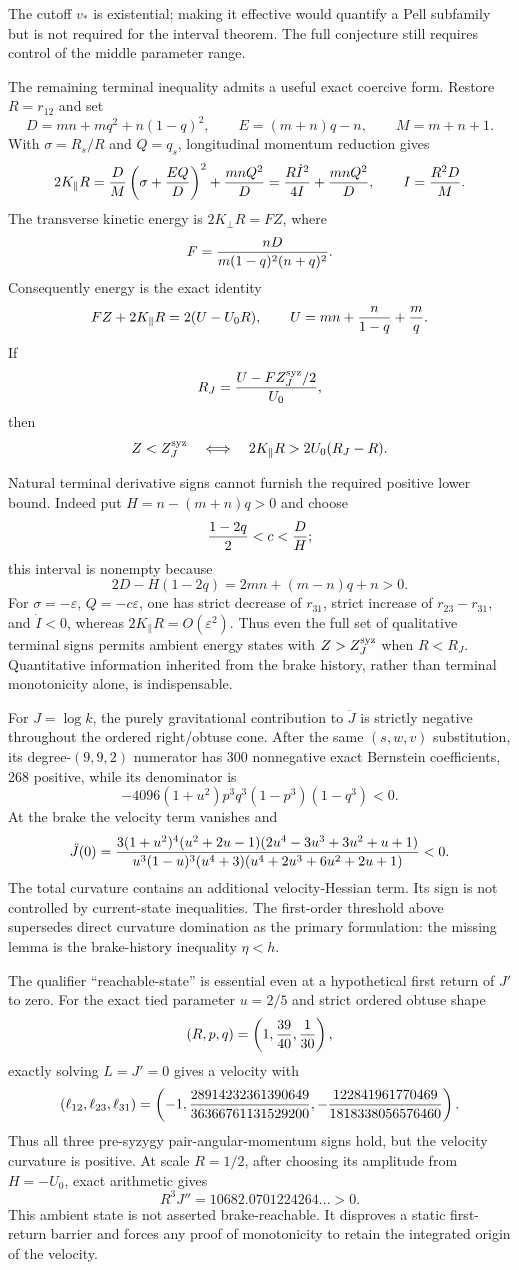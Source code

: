 \documentclass[11pt]{article}
\begin{document}
The cutoff $v_*$ is existential; making it effective would quantify a Pell
subfamily but is not required for the interval theorem.  The full conjecture
still requires control of the middle parameter range.

The remaining terminal inequality admits a useful exact coercive form.
Restore $R=r_{12}$ and set
\[
 D=mn+mq^2+n(1-q)^2,\qquad E=(m+n)q-n,\qquad M=m+n+1.
\]
With $\sigma=R_s/R$ and $Q=q_s$, longitudinal momentum reduction gives
\[
 2K_\parallel R
 ={D\over M}\left(\sigma+{E Q\over D}\right)^2
  +{mnQ^2\over D}
 ={R\dot I^2\over4I}+{mnQ^2\over D},\qquad I={R^2D\over M}.
\]
The transverse kinetic energy is $2K_\perp R=FZ$, where
\[
 F={nD\over m(1-q)^2(n+q)^2}.
\]
Consequently energy is the exact identity
\[
 FZ+2K_\parallel R=2(U-U_0R),\qquad
 U=mn+{n\over1-q}+{m\over q}.
\]
If
\[
 R_J={U-FZ_J^{\rm syz}/2\over U_0},
\]
then
\[
 Z<Z_J^{\rm syz}\quad\Longleftrightarrow\quad
 2K_\parallel R>2U_0(R_J-R).
\]

Natural terminal derivative signs cannot furnish the required positive
lower bound.  Indeed put $H=n-(m+n)q>0$ and choose
\[
 {1-2q\over2}<c<{D\over H};
\]
this interval is nonempty because
\[
 2D-H(1-2q)=2mn+(m-n)q+n>0.
\]
For $\sigma=-\varepsilon$, $Q=-c\varepsilon$, one has strict decrease of
$r_{31}$, strict increase of $r_{23}-r_{31}$, and $\dot I<0$, whereas
$2K_\parallel R=O(\varepsilon^2)$.  Thus even the full set of qualitative
terminal signs permits ambient energy states with $Z>Z_J^{\rm syz}$ when
$R<R_J$.  Quantitative information inherited from the brake history, rather
than terminal monotonicity alone, is indispensable.

For $J=\log k$, the purely gravitational contribution to $\ddot J$ is
strictly negative throughout the ordered right/obtuse cone.  After the same
$(s,w,v)$ substitution, its degree-$(9,9,2)$ numerator has 300 nonnegative
exact Bernstein coefficients, 268 positive, while its denominator is
\[
 -4096(1+u^2)p^3q^3(1-p^3)(1-q^3)<0.
\]
At the brake the velocity term vanishes and
\[
 \ddot J(0)=
 {3(1+u^2)^4(u^2+2u-1)(2u^4-3u^3+3u^2+u+1)
 \over
 u^3(1-u)^3(u^4+3)(u^4+2u^3+6u^2+2u+1)}<0.
\]
The total curvature contains an additional velocity-Hessian term.  Its
sign is not controlled by current-state inequalities.  The first-order
threshold above supersedes direct curvature domination as the primary
formulation: the missing lemma is the brake-history inequality $\eta<h$.

The qualifier ``reachable-state'' is essential even at a hypothetical first
return of $J'$ to zero.  For the exact tied parameter $u=2/5$ and strict
ordered obtuse shape
\[
 (R,p,q)=\left(1,{39\over40},{1\over30}\right),
\]
exactly solving $L=J'=0$ gives a velocity with
\[
 (\ell_{12},\ell_{23},\ell_{31})
 =\left(-1,
 {28914232361390649\over36366761131529200},
 -{122841961770469\over1818338056576460}\right).
\]
Thus all three pre-syzygy pair-angular-momentum signs hold, but the velocity curvature is
positive.  At scale $R=1/2$, after choosing its amplitude from $H=-U_0$,
exact arithmetic gives
\[
 R^3J''=10682.0701224264\ldots>0.
\]
This ambient state is not asserted brake-reachable. It disproves a static
first-return barrier and forces any proof of monotonicity to retain the
integrated origin of the velocity.
\end{document}
